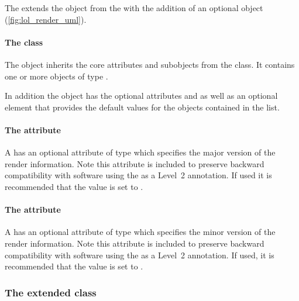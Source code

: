 The \RenderPackage extends the  object from the \LayoutPackage with the
addition of an optional \ListOfGlobalRenderInformation object (\ref{fig:lol_render_uml}).

\paragraph{The  class}
\label{listofglobalrenderinformation-class}

The \ListOfGlobalRenderInformation object inherits the core attributes and subobjects from the
 class. It contains one or more objects of type
\GlobalRenderInformation.

In addition the \ListOfGlobalRenderInformation object has the optional attributes 
 and  as well as an optional \DefaultValues 
element that provides the default values for the \GlobalRenderInformation objects
contained in the list.

\paragraph{The \fixttspace{} attribute}

A \ListOfGlobalRenderInformation has an optional attribute
 of type  which specifies the major version of the render information.  Note this attribute is included to preserve backward compatibility with software using the \RenderPackage as a Level~2 annotation. If used it is recommended that the value is set to .
 
\paragraph{The \fixttspace{} attribute}

A \ListOfGlobalRenderInformation has an optional attribute
 of type  which specifies the minor version of the render information.  Note this attribute is included to preserve backward compatibility with software using the \RenderPackage as a Level~2 annotation. If used, it is recommended that the value is set to .
 

\subsubsection{The extended  class}
\label{layout-class}

